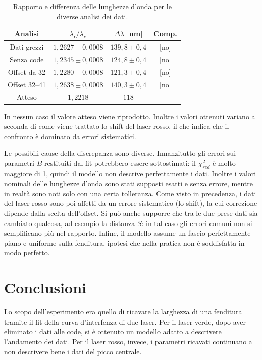 \documentclass[10pt,twocolumn]{article}
\begin{document}
\begin{table}[H]
  \centering
  \small
  \begin{tabular}{cccc}
    \toprule
    Analisi & $\lambda_{\mathrm{r}}/\lambda_{\mathrm{v}}$ & $\Delta\lambda$ [nm] & Comp. \\
    \midrule
    Dati grezzi & $1{,}2627 \pm 0{,}0008$ & $139{,}8 \pm 0{,}4$ & [no] \\
    Senza code & $1{,}2345 \pm 0{,}0008$ & $124{,}8 \pm 0{,}4$ & [no] \\
    Offset da 32 & $1{,}2280 \pm 0{,}0008$ & $121{,}3 \pm 0{,}4$ & [no] \\
    Offset 32--41 & $1{,}2638 \pm 0{,}0008$ & $140{,}3 \pm 0{,}4$ & [no] \\
    \midrule
    Atteso & $1{,}2218$ & $118$ & \\
    \bottomrule
  \end{tabular}
  \caption{Rapporto e differenza delle lunghezze d'onda per le diverse analisi dei dati.}
  \label{tab:robustezza_lambda}
\end{table}

\noindent
In nessun caso il valore atteso viene riprodotto. Inoltre i valori ottenuti variano a seconda di come viene trattato
lo shift del laser rosso, il che indica che il confronto è dominato da errori sistematici.

Le possibili cause della discrepanza sono diverse. Innanzitutto gli errori sui parametri $B$ restituiti dal fit
potrebbero essere sottostimati: il $\chi^2_{red}$ è molto maggiore di 1, quindi il modello non descrive perfettamente i dati.
Inoltre i valori nominali delle lunghezze d'onda sono stati supposti esatti e senza errore, mentre in realtà sono noti
solo con una certa tolleranza. Come visto in precedenza, i dati del laser rosso sono poi affetti da un errore sistematico
(lo shift), la cui correzione dipende dalla scelta dell'offset. Si può anche supporre che tra le due prese dati sia cambiato
qualcosa, ad esempio la distanza $S$: in tal caso gli errori comuni non si semplificano più nel rapporto.
Infine, il modello assume un fascio perfettamente piano e uniforme sulla fenditura, ipotesi che nella pratica
non è soddisfatta in modo perfetto.


\section{Conclusioni}

\noindent Lo scopo dell'esperimento era quello di ricavare la larghezza di una fenditura tramite il fit 
della curva d'interfenza di due laser. Per il laser verde, dopo aver eliminato i dati alle code, si è
ottenuto un modello adatto a descrivere l'andamento dei dati. Per il laser rosso, invece, i parametri 
ricavati continuano a non descrivere bene i dati del picco centrale. 
\end{document}
